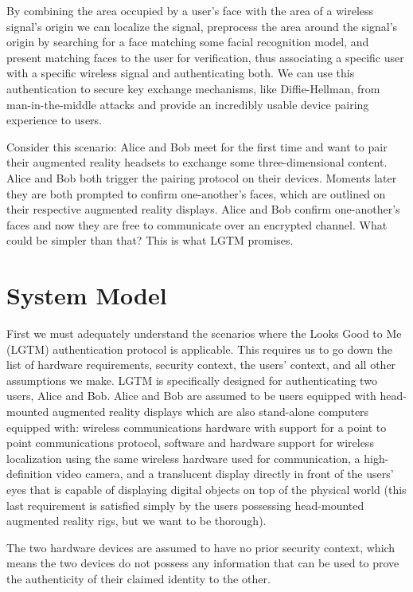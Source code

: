 \documentclass[12pt]{report}
\begin{document}
By combining the area occupied by a user's face with the area of a wireless signal's origin we can localize the signal, preprocess the area around the signal's origin by searching for a face matching some facial recognition model, and present matching faces to the user for verification, thus associating a specific user with a specific wireless signal and authenticating both. We can use this authentication to secure key exchange mechanisms, like Diffie-Hellman, from man-in-the-middle attacks and provide an incredibly usable device pairing experience to users. \par

Consider this scenario: Alice and Bob meet for the first time and want to pair their augmented reality headsets to exchange some three-dimensional content. Alice and Bob both trigger the pairing protocol on their devices. Moments later they are both prompted to confirm one-another's faces, which are outlined on their respective augmented reality displays. Alice and Bob confirm one-another's faces and now they are free to communicate over an encrypted channel. What could be simpler than that? This is what LGTM promises. \par

\section{System Model}
First we must adequately understand the scenarios where the Looks Good to Me (LGTM) authentication protocol is applicable. This requires us to go down the list of hardware requirements, security context, the users' context, and all other assumptions we make. 
LGTM is specifically designed for authenticating two users, Alice and Bob. Alice and Bob are assumed to be users equipped with head-mounted augmented reality displays which are also stand-alone computers equipped with: wireless communications hardware with support for a point to point communications protocol, software and hardware support for wireless localization using the same wireless hardware used for communication, a high-definition video camera, and a translucent display directly in front of the users' eyes that is capable of displaying digital objects on top of the physical world (this last requirement is satisfied simply by the users possessing head-mounted augmented reality rigs, but we want to be thorough). \par

The two hardware devices are assumed to have no prior security context, which means the two devices do not possess any information that can be used to prove the authenticity of their claimed identity to the other. \par
\end{document}
